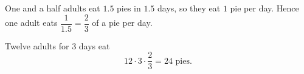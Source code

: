 One and a half adults eat $1.5$ pies in $1.5$ days, so they eat $1$ pie per day. Hence one adult eats $\dfrac{1}{1.5}=\dfrac{2}{3}$ of a pie per day.

Twelve adults for $3$ days eat
\[
12\cdot3\cdot\dfrac{2}{3}=\boxed{24}\text{ pies}.
\]
